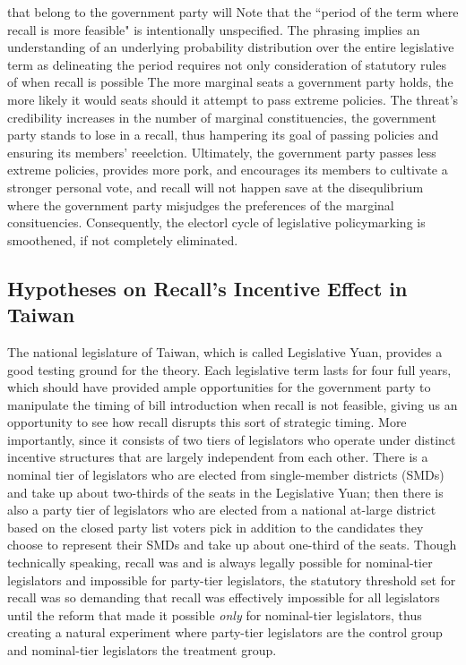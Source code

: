 \documentclass[hyphens, crop=false]{standalone}
\begin{document}
	
	that belong to the government party will
	Note that the
	``period of the term where recall is more feasible"
	is intentionally unspecified.
	The phrasing implies an understanding of an underlying
	probability distribution over the entire legislative term
	as delineating the period requires not only
	consideration of statutory rules of when recall is possible
	The more marginal seats
	a government party holds,
	the more likely it would seats
	should it attempt to pass extreme policies.
	The threat's credibility increases in the number of marginal constituencies,
	the government party stands to lose in a recall,
	thus hampering its goal of passing policies and ensuring its members' reeelction.
	Ultimately,
	the government party passes less extreme policies,
	provides more pork,
	and encourages its members to cultivate a stronger personal vote,
	and recall will not happen save at the disequlibrium where the government party
	misjudges the preferences of the marginal consituencies.
	Consequently, the electorl cycle of legislative policymarking is smoothened,
	if not completely eliminated.
	
	\subsection*{Hypotheses on Recall's Incentive Effect in Taiwan}
	
	The national legislature of Taiwan, which is called Legislative Yuan,
	provides a good testing ground for the theory.
	Each legislative term lasts for four full years,
	which should have provided ample opportunities for
	the government party to manipulate the timing of bill introduction
	when recall is not feasible,
	giving us an opportunity to see how recall disrupts this sort of strategic timing.
	More importantly,
	since it consists of two tiers of legislators
	who operate under distinct incentive structures
	that are largely independent from each other.
	There is a nominal tier of legislators
	who are elected from single-member districts (SMDs)
	and take up about two-thirds of the seats in the Legislative Yuan;
	then there is also a party tier of legislators
	who are elected from a national at-large district
	based on the closed party list voters pick in addition to the
	candidates they choose to represent their SMDs
	and take up about one-third of the seats.
	Though technically speaking,
	recall was and is always legally possible for nominal-tier legislators
	and impossible for party-tier legislators,
	the statutory threshold set for recall was so demanding that
	recall was effectively impossible for all legislators until the reform
	that made it possible \textit{only} for nominal-tier legislators,
	thus creating a natural experiment where
	party-tier legislators are the control group
	and
	nominal-tier legislators the treatment group.
	
\end{document}
